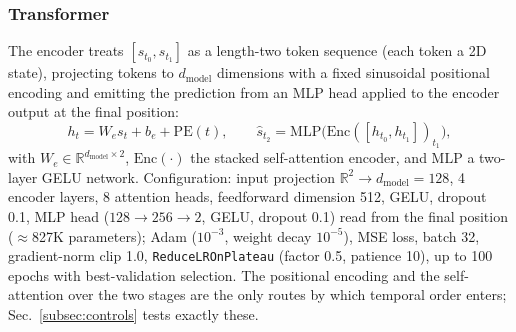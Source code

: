 \documentclass[pdflatex,sn-mathphys-num]{sn-jnl}
\theoremstyle{thmstyleone}%
\theoremstyle{thmstyletwo}%
\theoremstyle{thmstylethree}%
\begin{document}
\subsubsection{Transformer} The encoder treats $[s_{t_0},s_{t_1}]$ as a length-two token sequence (each token a 2D state), projecting tokens to $d_{\mathrm{model}}$ dimensions with a fixed sinusoidal positional encoding and emitting the prediction from an MLP head applied to the encoder output at the final position:
\begin{equation}
h_t = W_e s_t + b_e + \mathrm{PE}(t), \qquad
\hat{s}_{t_2} = \mathrm{MLP}\big(\mathrm{Enc}([h_{t_0},h_{t_1}])_{t_1}\big),
\label{eq:transformer}
\end{equation}
with $W_e\in\mathbb{R}^{d_{\mathrm{model}}\times 2}$, $\mathrm{Enc}(\cdot)$ the stacked self-attention encoder, and $\mathrm{MLP}$ a two-layer GELU network. Configuration: input projection $\mathbb{R}^2\!\rightarrow\!d_{\mathrm{model}}{=}128$, 4 encoder layers, 8 attention heads, feedforward dimension 512, GELU, dropout 0.1, MLP head ($128\!\rightarrow\!256\!\rightarrow\!2$, GELU, dropout 0.1) read from the final position ($\approx$827K parameters); Adam ($10^{-3}$, weight decay $10^{-5}$), MSE loss, batch 32, gradient-norm clip 1.0, \texttt{ReduceLROnPlateau} (factor 0.5, patience 10), up to 100 epochs with best-validation selection. The positional encoding and the self-attention over the two stages are the only routes by which temporal order enters; Sec.~\ref{subsec:controls} tests exactly these.
\end{document}
